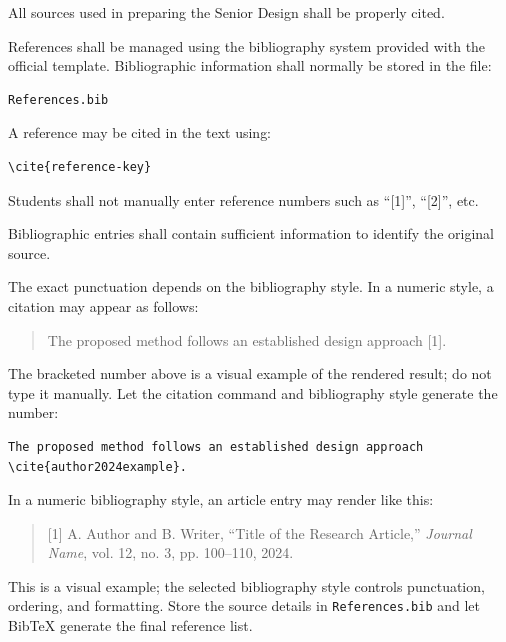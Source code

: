 {

All sources used in preparing the Senior Design shall be properly
cited.

References shall be managed using the bibliography system provided
with the official template. Bibliographic information shall normally
be stored in the file:

\begin{verbatim}
References.bib
\end{verbatim}

A reference may be cited in the text using:

\begin{verbatim}
\cite{reference-key}
\end{verbatim}

Students shall not manually enter reference numbers such as
``[1]'', ``[2]'', etc.

Bibliographic entries shall contain sufficient information to
identify the original source.


The exact punctuation depends on the bibliography style. In a
numeric style, a citation may appear as follows:

\begin{quote}
The proposed method follows an established design approach [1].
\end{quote}

The bracketed number above is a visual example of the rendered result;
do not type it manually. Let the citation command and bibliography
style generate the number:

\begin{verbatim}
The proposed method follows an established design approach
\cite{author2024example}.
\end{verbatim}


In a numeric bibliography style, an article entry may render like
this:

\begin{quote}
[1] A. Author and B. Writer, ``Title of the Research Article,''
\textit{Journal Name}, vol. 12, no. 3, pp. 100--110, 2024.
\end{quote}

This is a visual example; the selected bibliography style controls
punctuation, ordering, and formatting. Store the source details in
\verb|References.bib| and let BibTeX generate the final reference list.

}
